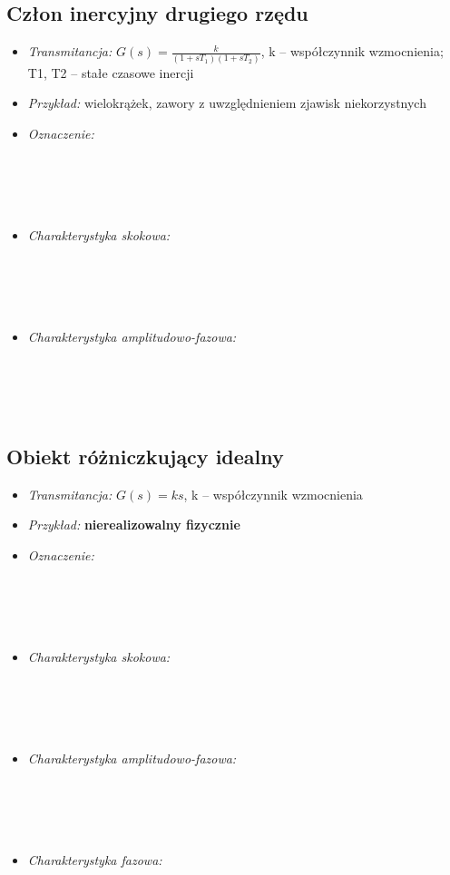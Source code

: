 \documentclass[a4paper]{article}
\begin{document}
\subsection{Człon inercyjny drugiego rzędu}
\begin{itemize}
\item \emph{Transmitancja: } $G(s) = \frac{k}{(1+sT_1)(1+sT_2)}$, k -- współczynnik wzmocnienia; T1, T2 -- stałe czasowe inercji
\item \emph{Przykład: } wielokrążek, zawory z uwzględnieniem zjawisk niekorzystnych
\item \emph {Oznaczenie: } \\\\\\\\\\
\item \emph{Charakterystyka skokowa: } \\\\\\\\\\
\item \emph{Charakterystyka amplitudowo-fazowa: } \\\\\\\\\\
\end{itemize}
\subsection{Obiekt różniczkujący idealny}
\begin{itemize}
\item \emph{Transmitancja: } $G(s) = ks$, k -- współczynnik wzmocnienia
\item \emph{Przykład: } \textbf{nierealizowalny fizycznie}
\item \emph {Oznaczenie: } \\\\\\\\\\
\item \emph{Charakterystyka skokowa: } \\\\\\\\\\
\item \emph{Charakterystyka amplitudowo-fazowa: } \\\\\\\\\\
\item \emph{Charakterystyka fazowa: } \\\\\\\\\\
\end{itemize}\pagebreak
\end{document}
